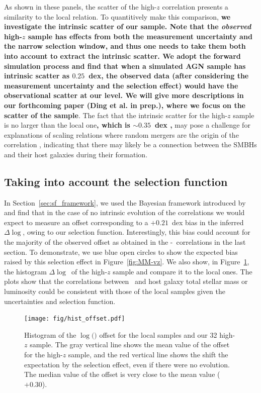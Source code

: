 \documentclass[apj]{emulateapj}
\begin{document}
As shown in these panels, the scatter of the high-$z$ correlation presents a similarity to the local relation. To quantitively make this comparison, {\bf we investigate the intrinsic scatter of our sample. Note that the {\it observed} high-$z$ sample has effects from both the measurement uncertainty and the narrow selection window, and thus one needs to take them both into account to extract the intrinsic scatter. We adopt the forward simulation process and find that when a simulated AGN sample has intrinsic scatter as $0.25$~dex,  the observed data (after considering the measurement uncertainty and the selection effect) would have the observational scatter at our level. We will give more descriptions in our forthcoming paper (Ding et al. in prep.), where we focus on the scatter of the sample}. The fact that the intrinsic scatter for the high-$z$ sample is no larger than the local one{\bf, which is $\sim0.35$~dex \citep{Gul++09},} may pose a challenge for explanations of scaling relations where random mergers are the origin of the correlation \citep{Peng2007,Jahnke2011}, indicating that there may likely be a connection between the SMBHs and their host galaxies during their formation.

\subsection{Taking into account the selection function}
\label{select_eff}

In Section~\ref{sec:sf_framework}, we used the Bayesian framework introduced by \citet{Schulze2011} and find that in the case of no intrinsic evolution of the correlations we would expect to measure an offset corresponding to a $+0.21$~dex bias in the inferred $\Delta \log$\mbh, owing to our selection function. Interestingly, this bias could account for the majority of the observed offset as obtained in the \mbh-\smass\ correlations in the last section. %
To demonstrate, we use blue open circles to show the expected bias raised by this selection effect in Figure~\ref{fig:MM-vz}. We also show, in Figure~\ref{fig:offset_hist}, the histogram $\Delta \log$\mbh\ of the high-$z$ sample and compare it to the local ones. 
The plots show that the correlations between \mbh\ and host galaxy total stellar mass or luminosity could be consistent with those of the local samples given the uncertainties and selection function.


\begin{figure}
\centering
{
\texttt{[image: fig/hist\_offset.pdf]}
}
\caption{\label{fig:offset_hist} 
Histogram of the $\log($\mbh$)$ offset for the local samples and our 32 high-$z$ sample. The gray vertical line shows the mean value of the offset for the high-$z$ sample, and the red vertical line shows the shift the expectation by the selection effect, even if there were no evolution. The median value of the offset is very close to the mean value ($+0.30$).
}
\end{figure} 
\end{document}
